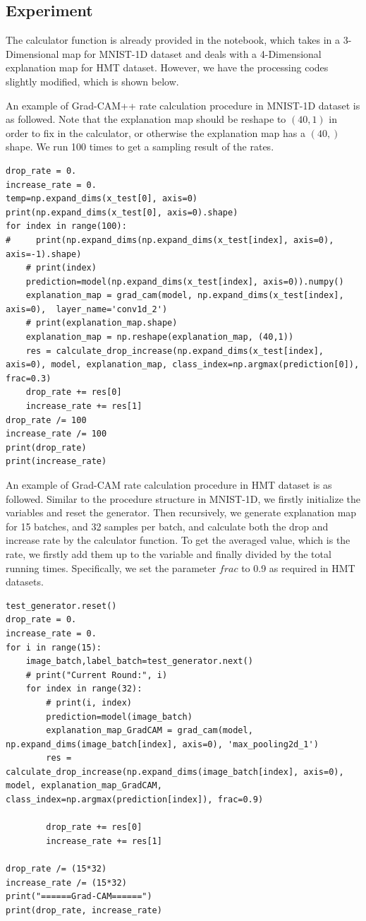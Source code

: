 \documentclass[conference]{IEEEtran}
\begin{document}
\subsection {Experiment}

The calculator function is already provided in the notebook, which takes in a 3-Dimensional map for MNIST-1D dataset and deals with a 4-Dimensional explanation map for HMT dataset. However, we have the processing codes slightly modified, which is shown below.

An example of Grad-CAM++ rate calculation procedure in MNIST-1D dataset is as followed. Note that the explanation map should be reshape to $(40,1)$ in order to fix in the calculator, or otherwise the explanation map has a $(40,)$ shape. We run 100 times to get a sampling result of the rates.

\begin{lstlisting}
drop_rate = 0.
increase_rate = 0.
temp=np.expand_dims(x_test[0], axis=0)
print(np.expand_dims(x_test[0], axis=0).shape)
for index in range(100):
#     print(np.expand_dims(np.expand_dims(x_test[index], axis=0), axis=-1).shape)
    # print(index)
    prediction=model(np.expand_dims(x_test[index], axis=0)).numpy()
    explanation_map = grad_cam(model, np.expand_dims(x_test[index], axis=0),  layer_name='conv1d_2')
    # print(explanation_map.shape)
    explanation_map = np.reshape(explanation_map, (40,1))
    res = calculate_drop_increase(np.expand_dims(x_test[index], axis=0), model, explanation_map, class_index=np.argmax(prediction[0]), frac=0.3)
    drop_rate += res[0]
    increase_rate += res[1]
drop_rate /= 100
increase_rate /= 100
print(drop_rate)
print(increase_rate)
\end{lstlisting}

An example of Grad-CAM rate calculation procedure in HMT dataset is as followed. Similar to the procedure structure in MNIST-1D, we firstly initialize the variables and reset the generator. Then recursively, we generate explanation map for 15 batches, and 32 samples per batch, and calculate both the drop and increase rate by the calculator function. To get the averaged value, which is the rate, we firstly add them up to the variable and finally divided by the total running times. Specifically, we set the parameter $frac$ to 0.9 as required in HMT datasets.

\begin{lstlisting}
test_generator.reset()
drop_rate = 0.
increase_rate = 0.
for i in range(15):
    image_batch,label_batch=test_generator.next()
    # print("Current Round:", i)
    for index in range(32):
        # print(i, index)
        prediction=model(image_batch)
        explanation_map_GradCAM = grad_cam(model, np.expand_dims(image_batch[index], axis=0), 'max_pooling2d_1')
        res = calculate_drop_increase(np.expand_dims(image_batch[index], axis=0), model, explanation_map_GradCAM, class_index=np.argmax(prediction[index]), frac=0.9)

        drop_rate += res[0]
        increase_rate += res[1]

drop_rate /= (15*32)
increase_rate /= (15*32)
print("======Grad-CAM======")
print(drop_rate, increase_rate)
\end{lstlisting}
\end{document}
